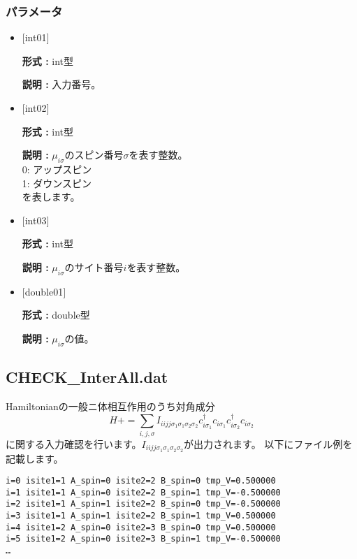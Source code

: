 \subsubsection{パラメータ}
 \begin{itemize}

   \item  $[$int01$]$ 
   
    {\bf 形式 :} int型

   {\bf 説明 :} 入力番号。
   
   \item  $[$int02$]$ 
   
    {\bf 形式 :} int型

   {\bf 説明 :} $\mu_{i\sigma}$のスピン番号$\sigma$を表す整数。\\
0: アップスピン\\
1: ダウンスピン\\
を表します。
   
   \item  $[$int03$]$ 
   
    {\bf 形式 :} int型

    {\bf 説明 :}  $\mu_{i\sigma}$のサイト番号$i$を表す整数。
 
   \item  $[$double01$]$ 
   
    {\bf 形式 :} double型

   {\bf 説明 :} $\mu_{i\sigma}$の値。
     
\end{itemize}

\subsection{CHECK\_InterAll.dat}
Hamiltonianの一般ニ体相互作用のうち対角成分
\begin{equation}
H+=\sum_{i,j, \sigma} I_{iijj\sigma_1\sigma_1\sigma_2\sigma_2} c_{i\sigma_1}^{\dagger}c_{i\sigma_1}c_{i\sigma_2}^{\dagger}c_{i\sigma_2}
\end{equation}
に関する入力確認を行います。$ I_{iijj\sigma_1\sigma_1\sigma_2\sigma_2}$が出力されます。
以下にファイル例を記載します。

\begin{minipage}{12.5cm}
\begin{screen}
\begin{verbatim}
i=0 isite1=1 A_spin=0 isite2=2 B_spin=0 tmp_V=0.500000 
i=1 isite1=1 A_spin=0 isite2=2 B_spin=1 tmp_V=-0.500000 
i=2 isite1=1 A_spin=1 isite2=2 B_spin=0 tmp_V=-0.500000 
i=3 isite1=1 A_spin=1 isite2=2 B_spin=1 tmp_V=0.500000 
i=4 isite1=2 A_spin=0 isite2=3 B_spin=0 tmp_V=0.500000 
i=5 isite1=2 A_spin=0 isite2=3 B_spin=1 tmp_V=-0.500000 
…
\end{verbatim}
\end{screen}
\end{minipage}

